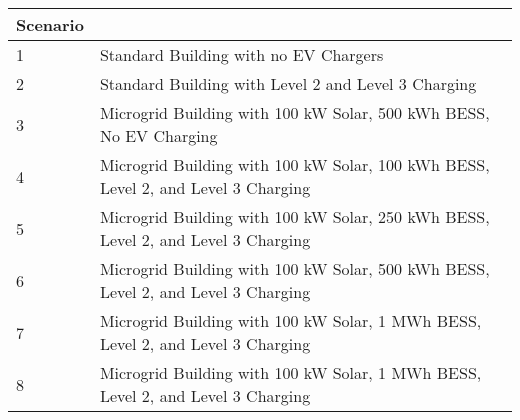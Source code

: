 \begin{tabularx}{\linewidth}{l | l}
\toprule
 Scenario &  \\
\midrule
		1  & Standard Building with no EV Chargers\\
        2 & Standard Building with Level 2 and Level 3 Charging\\
        3 & Microgrid Building with 100 kW Solar, 500 kWh BESS, No EV Charging \\
        4 & Microgrid Building with 100 kW Solar, 100 kWh BESS, Level 2, and Level 3 Charging\\
        5 & Microgrid Building with 100 kW Solar, 250 kWh BESS, Level 2, and Level 3 Charging\\
        6 & Microgrid Building with 100 kW Solar, 500 kWh BESS, Level 2, and Level 3 Charging\\
        7 & Microgrid Building with 100 kW Solar, 1 MWh BESS, Level 2, and Level 3 Charging\\
        8 & Microgrid Building with 100 kW Solar, 1 MWh BESS, Level 2, and Level 3 Charging\\
\bottomrule
\end{tabularx}
